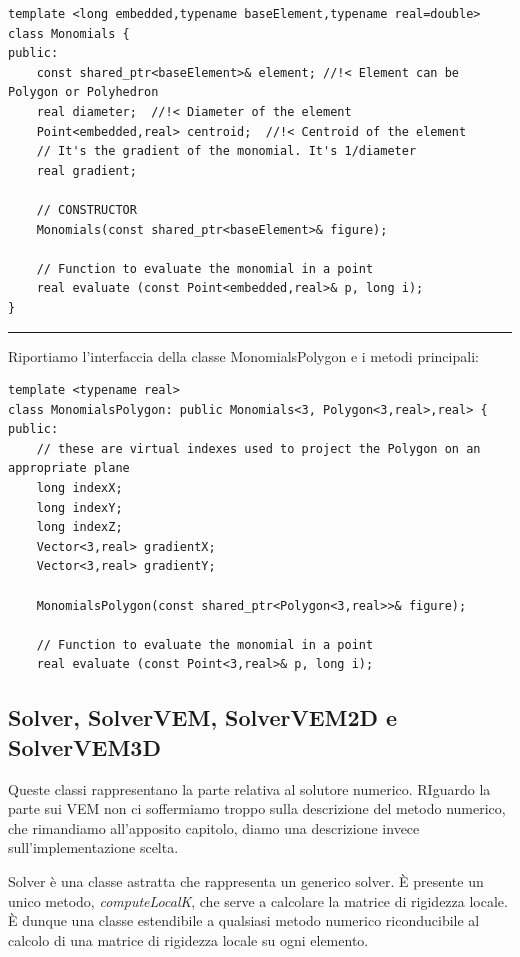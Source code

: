 \documentclass[oneside,12pt]{book}  %
\theoremstyle{plain}
\theoremstyle{definition}
\theoremstyle{remark}
\numberwithin{equation}{chapter} %
\begin{document}
\begin{verbatim}
template <long embedded,typename baseElement,typename real=double>
class Monomials {
public:
    const shared_ptr<baseElement>& element;	//!< Element can be Polygon or Polyhedron
    real diameter;  //!< Diameter of the element
    Point<embedded,real> centroid;  //!< Centroid of the element
    // It's the gradient of the monomial. It's 1/diameter
    real gradient;

    // CONSTRUCTOR
    Monomials(const shared_ptr<baseElement>& figure);

    // Function to evaluate the monomial in a point
    real evaluate (const Point<embedded,real>& p, long i);
}

\end{verbatim}



\noindent\rule{14cm}{1pt}

Riportiamo l'interfaccia della classe MonomialsPolygon e i metodi principali:

\begin{verbatim}
template <typename real>
class MonomialsPolygon: public Monomials<3, Polygon<3,real>,real> {
public:
    // these are virtual indexes used to project the Polygon on an appropriate plane
    long indexX;
    long indexY;
    long indexZ;
    Vector<3,real> gradientX;
    Vector<3,real> gradientY;
	
    MonomialsPolygon(const shared_ptr<Polygon<3,real>>& figure); 

    // Function to evaluate the monomial in a point
    real evaluate (const Point<3,real>& p, long i);

\end{verbatim}

\subsection{Solver, SolverVEM, SolverVEM2D e SolverVEM3D}
Queste classi rappresentano la parte relativa al solutore numerico. 
RIguardo la parte sui VEM non ci soffermiamo troppo sulla descrizione
del metodo numerico, che rimandiamo all'apposito capitolo, diamo una
descrizione invece sull'implementazione scelta.

Solver \`e una classe astratta che rappresenta un generico
solver. \`E presente un unico metodo, \textit{computeLocalK}, che
serve a calcolare la matrice di rigidezza locale. \`E dunque una
classe estendibile a qualsiasi metodo numerico riconducibile al
calcolo di una matrice di rigidezza locale su ogni elemento.
\end{document}
